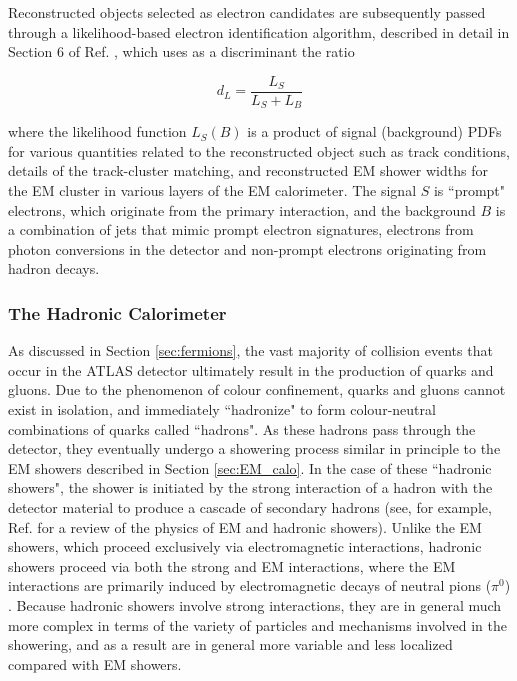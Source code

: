 Reconstructed objects selected as electron candidates are subsequently passed through a likelihood-based electron identification algorithm, described in detail in Section 6 of Ref. \cite{electron_reco}, which uses as a discriminant the ratio 

\begin{equation}
\label{eq:electron_likelihood_id_discriminant}
d_L = \frac{L_S}{L_S+L_B}
\end{equation}

\noindent where the likelihood function \(L_S(B)\) is a product of signal (background) PDFs for various quantities related to the reconstructed object such as track conditions, details of the track-cluster matching, and reconstructed EM shower widths for the EM cluster in various layers of the EM calorimeter. The signal \(S\) is ``prompt" electrons, which originate from the primary interaction, and the background \(B\) is a combination of jets that mimic prompt electron signatures, electrons from photon conversions in the detector and non-prompt electrons originating from hadron decays.

\subsubsection{The Hadronic Calorimeter}
\label{sec:had_calo}

As discussed in Section \ref{sec:fermions}, the vast majority of collision events that occur in the ATLAS detector ultimately result in the production of quarks and gluons. Due to the phenomenon of colour confinement, quarks and gluons cannot exist in isolation, and immediately ``hadronize" to form colour-neutral combinations of quarks called ``hadrons". As these hadrons pass through the detector, they eventually undergo a showering process similar in principle to the EM showers described in Section \ref{sec:EM_calo}. In the case of these ``hadronic showers", the shower is initiated by the strong interaction of a hadron with the detector material to produce a cascade of secondary hadrons (see, for example, Ref. \cite{shower_theory} for a review of the physics of EM and hadronic showers). Unlike the EM showers, which proceed exclusively via electromagnetic interactions, hadronic showers proceed via both the strong and EM interactions, where the EM interactions are primarily induced by electromagnetic decays of neutral pions (\(\pi^0\)) \cite{shower_theory}. Because hadronic showers involve strong interactions, they are in general much more complex in terms of the variety of particles and mechanisms involved in the showering, and as a result are in general more variable and less localized compared with EM showers.

